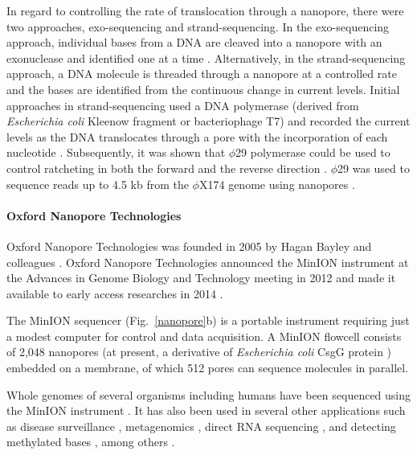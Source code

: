 In regard to controlling the rate of translocation through a nanopore,
there were two approaches, exo-sequencing and strand-sequencing.
In the exo-sequencing approach, individual bases from a DNA are cleaved
into a nanopore with an exonuclease and identified one at a time
\citep{astier2006toward,clarke2009continuous}.
Alternatively, in the strand-sequencing approach, a DNA molecule is
threaded through a nanopore at a controlled rate and the bases are
identified from the continuous change in current levels. Initial
approaches in strand-sequencing used a DNA polymerase (derived from
\emph{Escherichia coli} Kleenow fragment or bacteriophage T7) and
recorded the current levels as the DNA translocates through a pore with
the incorporation of each nucleotide
\citep{benner2007sequence,cockroft2008single,gyarfas2009mapping,
chu2010real}.
%
Subsequently, it was shown that $\phi$29 polymerase could be used to
control ratcheting in both the forward and the reverse direction
\citep{lieberman2010processive,manrao2012reading,cherf2012automated}.
$\phi$29 was used to sequence reads up to 4.5 kb from the $\phi$X174
genome using nanopores \citep{laszlo2014decoding}.


\paragraph{Oxford Nanopore Technologies}
Oxford Nanopore Technologies was founded in 2005 by Hagan Bayley and
colleagues \citep{deamer2016three}. Oxford Nanopore Technologies
announced the MinION instrument at the Advances in Genome Biology and
Technology meeting in 2012 and made it available to early access
researches in 2014 \citep{deamer2016three,bayley2015nanopore}.

The MinION sequencer (Fig.~\ref{nanopore}b) is a portable instrument
requiring just a modest computer for control and data acquisition.  A
MinION flowcell consists of 2,048 nanopores (at present, a derivative of
\emph{Escherichia coli} CsgG protein \citep{brown2016nanopore}) embedded
on a membrane, of which 512 pores can sequence molecules in parallel.

Whole genomes of several organisms including humans have been sequenced
using the MinION instrument \citep{loman2015complete,stancu2017mapping,
jain2018nanopore,bowden2019sequencing,moss2020complete}. It has also
been used in several other applications such as disease surveillance
\citep{quick2016real,faria2016mobile}, metagenomics
\citep{goordial2017situ,charalampous2019nanopore,leggett2020rapid},
direct RNA sequencing \citep{garalde2018highly,workman2019nanopore,
depledge2019direct}, and detecting methylated bases
\citep{rand2017mapping,simpson2017detecting,liu2019accurate}, among
others \citep{jain2016oxford}.


